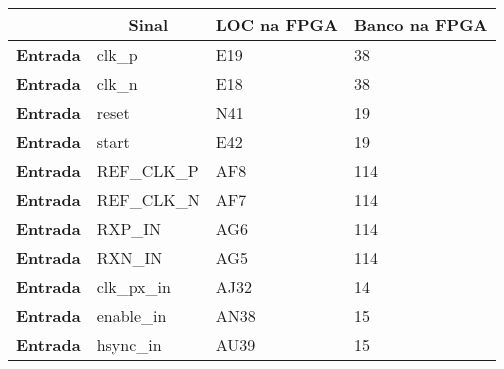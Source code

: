 \begin{table}[h!]
	\centering
	\begin{tabular}{rlll}
		\hline
		\multicolumn{1}{l}{}                  & \multicolumn{1}{c}{\textbf{Sinal}}     & \multicolumn{1}{c}{\textbf{LOC na FPGA}} & \multicolumn{1}{c}{\textbf{Banco na FPGA}} \\ \hline
		\multicolumn{1}{r|}{\textbf{Entrada}} & clk\_p                                 & E19                                      & 38                                         \\
		\multicolumn{1}{r|}{\textbf{Entrada}} & clk\_n                                 & E18                                      & 38                                         \\
		\multicolumn{1}{r|}{\textbf{Entrada}} & reset                                  & N41                                      & 19                                         \\
		\multicolumn{1}{r|}{\textbf{Entrada}} & start                                  & E42                                      & 19                                         \\
		\multicolumn{1}{r|}{\textbf{Entrada}} & REF\_CLK\_P                            & AF8                                      & 114                                        \\
		\multicolumn{1}{r|}{\textbf{Entrada}} & REF\_CLK\_N                            & AF7                                      & 114                                        \\
		\multicolumn{1}{r|}{\textbf{Entrada}} & RXP\_IN                                & AG6                                      & 114                                        \\
		\multicolumn{1}{r|}{\textbf{Entrada}} & RXN\_IN                                & AG5                                      & 114                                        \\
		\multicolumn{1}{r|}{\textbf{Entrada}} & clk\_px\_in                            & AJ32                                     & 14                                         \\
		\multicolumn{1}{r|}{\textbf{Entrada}} & enable\_in                             & AN38                                     & 15                                         \\
		\multicolumn{1}{r|}{\textbf{Entrada}} & hsync\_in                              & AU39                                     & 15                                         \\

\end{tabular}
\end{table}
